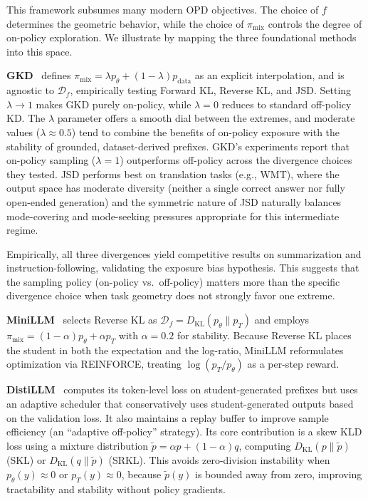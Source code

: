 \documentclass{article} %
\newcommand{\KL}{D_{\mathrm{KL}}}
\newcommand{\ptheta}{p_\theta}
\newcommand{\pteacher}{p_T}
\newcommand{\pdata}{p_{\mathrm{data}}}
\begin{document}
This framework subsumes many modern OPD objectives. The choice of $f$ determines the geometric behavior, while the choice of $\pi_{\mathrm{mix}}$ controls the degree of on-policy exploration. We illustrate by mapping the three foundational methods into this space.

\textbf{GKD}~\citep{2306.13649} defines $\pi_{\mathrm{mix}} = \lambda \ptheta + (1-\lambda)\pdata$ as an explicit interpolation, and is agnostic to $\mathcal{D}_f$, empirically testing Forward KL, Reverse KL, and JSD. Setting $\lambda \to 1$ makes GKD purely on-policy, while $\lambda = 0$ reduces to standard off-policy KD. The $\lambda$ parameter offers a smooth dial between the extremes, and moderate values ($\lambda \approx 0.5$) tend to combine the benefits of on-policy exposure with the stability of grounded, dataset-derived prefixes. GKD's experiments report that on-policy sampling ($\lambda = 1$) outperforms off-policy across the divergence choices they tested. JSD performs best on translation tasks (e.g., WMT), where the output space has moderate diversity (neither a single correct answer nor fully open-ended generation) and the symmetric nature of JSD naturally balances mode-covering and mode-seeking pressures appropriate for this intermediate regime.

Empirically, all three divergences yield competitive results on summarization and instruction-following, validating the exposure bias hypothesis. This suggests that the sampling policy (on-policy vs.\ off-policy) matters more than the specific divergence choice when task geometry does not strongly favor one extreme.

\textbf{MiniLLM}~\citep{2306.08543} selects Reverse KL as $\mathcal{D}_f = \KL(\ptheta \parallel \pteacher)$ and employs $\pi_{\mathrm{mix}} = (1-\alpha)\ptheta + \alpha\pteacher$ with $\alpha = 0.2$ for stability. Because Reverse KL places the student in both the expectation and the log-ratio, MiniLLM reformulates optimization via REINFORCE, treating $\log(\pteacher/\ptheta)$ as a per-step reward.

\textbf{DistiLLM}~\citep{2402.03898} computes its token-level loss on student-generated prefixes but uses an adaptive scheduler that conservatively uses student-generated outputs based on the validation loss. It also maintains a replay buffer to improve sample efficiency (an ``adaptive off-policy'' strategy). Its core contribution is a skew KLD loss using a mixture distribution $\tilde{p} = \alpha p + (1-\alpha)q$, computing $\KL(p \parallel \tilde{p})$ (SKL) or $\KL(q \parallel \tilde{p})$ (SRKL). This avoids zero-division instability when $\ptheta(y) \approx 0$ or $\pteacher(y) \approx 0$, because $\tilde{p}(y)$ is bounded away from zero, improving tractability and stability without policy gradients.
\end{document}
